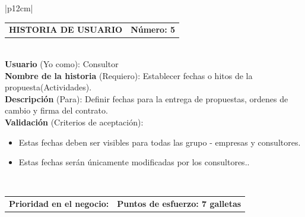 \documentclass[11pt,letterpaper]{report}
\begin{document}
		\begin{center}	
			\begin{tabular}{|p{12cm}|}
				\hline
				\begin{tabular}{c|c}
					\textbf{HISTORIA DE USUARIO} & \textbf{Número: 5} \\
				\end{tabular} \\ \hline
				\textbf{Usuario} (Yo como): Consultor \\ \hline
				\textbf{Nombre de la historia} (Requiero): Establecer fechas o hitos de la propuesta(Actividades). \\ \hline
				\textbf{Descripción} (Para): Definir fechas para la entrega de propuestas, ordenes de cambio y firma del contrato. \\ \hline
				\textbf{Validación} (Criterios de aceptación): \\
				\begin{minipage}{12cm}
					\begin{itemize}
						\item Estas fechas deben ser visibles para todas las grupo - empresas y consultores.
						\item Estas fechas serán únicamente modificadas por los consultores..
					\end{itemize}
				\end{minipage} \\ \hline
				\begin{tabular}{p{6cm}|c}
					\textbf{Prioridad en el negocio: } & \textbf{Puntos de esfuerzo: 7 galletas} \\
				\end{tabular} \\ \hline
			\end{tabular}
		\end{center}
	
\end{document}
